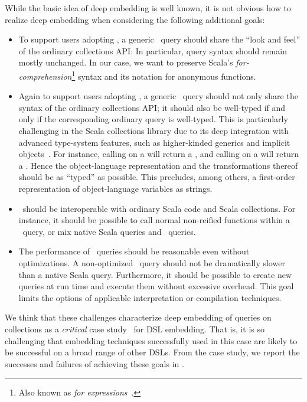 While the basic idea of deep embedding is well known, it is not obvious how to realize deep embedding
when considering the following additional goals:

\begin{itemize}
\item To support users adopting \LoS, a generic \LoS\ query should share the ``look and feel'' of the ordinary collections API: In particular, query syntax should remain mostly unchanged. In our case, we want to preserve  Scala's \emph{for-comprehension}\footnote{Also known as \emph{for expressions}~\citep[Ch.~23]{Odersky11book}.} syntax and its notation
 for anonymous functions.
 \item Again to support users adopting \LoS, a generic \LoS\ query should not only share the syntax of the ordinary collections API; it should also be well-typed if and only if the corresponding ordinary query is well-typed.
 This is particularly challenging in the Scala collections
 library due to its deep integration with advanced type-system features, such as higher-kinded generics
 and implicit objects~\citep{odersky2009fighting}. For instance, calling  on a  will return a , and calling  on a 
 will return a . Hence the object-language representation and the
 transformations thereof should be as ``typed'' as possible. This precludes, among others, a first-order
 representation of object-language variables as strings.
 \item \LoS\ should be interoperable with ordinary Scala code and Scala collections. For instance, it should
 be possible to call normal non-reified functions within a \LoS\ query, or mix native Scala queries and \LoS\ queries.
 \item The performance of \LoS\ queries should be reasonable even without optimizations. A non-optimized \LoS\ query
 should not be dramatically slower than a native Scala query. Furthermore, it should be possible to create new queries at run time and execute them without excessive overhead.
 This goal limits the options of applicable interpretation or compilation techniques.
\end{itemize}
 
We think that these challenges characterize deep embedding of queries on collections as a \emph{critical} case study~\citep{flyvbjerg06five} for DSL embedding.
That is, it is so challenging that embedding techniques successfully used in this case are likely to be successful on a broad range of other DSLs.
From the case study, we report the successes and failures of achieving these goals in \LoS. 
